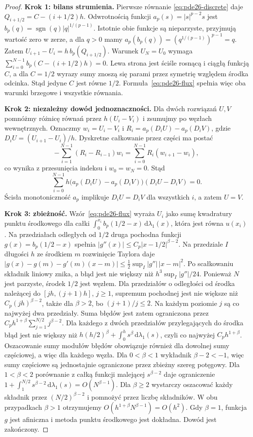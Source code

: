 \begin{proof}
\textbf{Krok 1: bilans strumienia.} Pierwsze równanie
\eqref{eq:pde26-discrete} daje
$Q_{i+1/2}=C-(i+1/2)h$. Odwrotnością funkcji
$a_p(s)=|s|^{p-2}s$ jest
$b_p(q)=\operatorname{sgn}(q)|q|^{1/(p-1)}$.
Istotnie obie funkcje są nieparzyste, przyjmują
wartość zero w zerze, a dla $q>0$ mamy
$a_p(b_p(q))=(q^{1/(p-1)})^{p-1}=q$.
Zatem $U_{i+1}-U_i=h\,b_p(Q_{i+1/2})$.
Warunek $U_N=U_0$ wymaga
$\sum_{i=0}^{N-1}b_p(C-(i+1/2)h)=0$.
Lewa strona jest ściśle rosnącą i ciągłą funkcją
$C$, a dla $C=1/2$ wyrazy sumy znoszą się parami
przez symetrię względem środka odcinka. Stąd jedyne
$C$ jest równe $1/2$. Formuła~\eqref{eq:pde26-flux}
spełnia więc oba warunki brzegowe i wszystkie równania.

\textbf{Krok 2: niezależny dowód jednoznaczności.}
Dla dwóch rozwiązań $U,V$ pomnóżmy różnicę
równań przez $h(U_i-V_i)$ i zsumujmy po węzłach
wewnętrznych. Oznaczmy $w_i=U_i-V_i$ i $R_i=a_p(D_iU)-a_p(D_iV)$,
gdzie $D_iU=(U_{i+1}-U_i)/h$.
Dyskretne całkowanie przez części ma postać
\[
 -\sum_{i=1}^{N-1}(R_i-R_{i-1})w_i
 =\sum_{i=0}^{N-1}R_i(w_{i+1}-w_i),
\]
co wynika z przesunięcia indeksu i $w_0=w_N=0$.
Stąd
\[
 \sum_{i=0}^{N-1}h\bigl(a_p(D_iU)-a_p(D_iV)\bigr)
 (D_iU-D_iV)=0.
\]
Ścisła monotoniczność
$a_p$ implikuje $D_iU=D_iV$ dla wszystkich $i$,
a zatem $U=V$.

\textbf{Krok 3: zbieżność.} Wzór~\eqref{eq:pde26-flux}
wyraża $U_i$ jako sumę kwadratury punktu środkowego dla
całki $\int_0^{x_i}b_p(1/2-x)\,\mathrm d\lambda_1(x)$,
która jest równa $u(x_i)$.
Na przedziałach odległych od $1/2$ druga pochodna
funkcji $g(x)=b_p(1/2-x)$ spełnia
$|g''(x)|\le C_p|x-1/2|^{\beta-2}$.
Na przedziale $I$ długości $h$ ze środkiem $m$
rozwinięcie Taylora daje
$|g(x)-g(m)-g'(m)(x-m)|\le
\frac12\sup_I|g''|\,|x-m|^2$.
Po scałkowaniu składnik liniowy znika, a błąd
jest nie większy niż $h^3\sup_I|g''|/24$.
Ponieważ $N$ jest parzyste, środek $1/2$ jest węzłem.
Dla przedziałów o odległości od środka należącej
do $[jh,(j+1)h]$, $j\ge1$, supremum pochodnej
jest nie większe niż $C_p(jh)^{\beta-2}$,
także dla $\beta>2$, bo $(j+1)/j\le2$.
Na każdym poziomie $j$ są co najwyżej dwa przedziały.
Suma błędów jest zatem ograniczona przez
$C_ph^{1+\beta}\sum_{j=1}^{N/2}j^{\beta-2}$.
Dla każdego z dwóch przedziałów przylegających
do środka błąd jest nie większy niż
$h(h/2)^\beta+\int_0^h s^\beta\,\mathrm d\lambda_1(s)$,
czyli co najwyżej $C_ph^{1+\beta}$.
Oszacowanie sumy modułów błędów obowiązuje również
dla dowolnej sumy częściowej, a więc dla każdego węzła.
Dla $0<\beta<1$ wykładnik $\beta-2<-1$,
więc sumy częściowe są jednostajnie ograniczone
przez zbieżny szereg potęgowy. Dla $1<\beta<2$
porównanie z całką funkcji malejącej $s^{\beta-2}$
daje ograniczenie $1+\int_1^{N/2}s^{\beta-2}
\,\mathrm d\lambda_1(s)=O(N^{\beta-1})$.
Dla $\beta\ge2$ wystarczy oszacować każdy składnik
przez $(N/2)^{\beta-2}$ i pomnożyć przez liczbę
składników. W obu przypadkach $\beta>1$
otrzymujemy $O(h^{1+\beta}N^{\beta-1})=O(h^2)$.
Gdy $\beta=1$, funkcja $g$ jest afiniczna i metoda
punktu środkowego jest dokładna. Dowód jest zakończony.
\end{proof}

